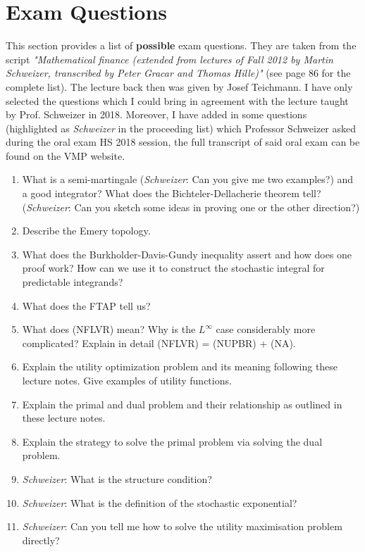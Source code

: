 \documentclass[12pt,a4paper, twoside]{article}
\theoremstyle{definition}
\begin{document}
\section{Exam Questions}
This section provides a list of \textbf{possible} exam questions. They are taken from the script \textit{"Mathematical finance (extended from lectures of Fall 2012 by Martin Schweizer, transcribed by Peter Gracar and Thomas Hille)"} (see page 86 for the complete list). The lecture back then was given by Josef Teichmann. I have only selected the questions which I could bring in agreement with the lecture taught by Prof. Schweizer in 2018. Moreover, I have added in some questions (highlighted as \textit{Schweizer} in the proceeding list) which Professor Schweizer asked during the oral exam HS 2018 session, the full transcript of said oral exam can be found on the VMP website. 
\begin{enumerate}
\item What is a semi-martingale (\textit{Schweizer}: Can you give me two examples?) and a good integrator? What does the Bichteler-Dellacherie theorem tell? (\textit{Schweizer}: Can you sketch some ideas in proving one or the other direction?)
\item Describe the Emery topology.
\item What does the Burkholder-Davis-Gundy inequality assert and how does one proof work? How can we use it to construct the stochastic integral for predictable integrands?
\item What does the FTAP tell us?
\item What does (NFLVR) mean? Why is the $L^\infty$ case considerably more complicated? Explain in detail (NFLVR) = (NUPBR) + (NA).
\item Explain the utility optimization problem and its meaning following these lecture notes. Give examples of utility functions.
\item Explain the primal and dual problem and their relationship as outlined in these lecture notes. 
\item Explain the strategy to solve the primal problem via solving the dual problem. 
\item \textit{Schweizer}: What is the structure condition?
\item \textit{Schweizer}: What is the definition of the stochastic exponential?
\item \textit{Schweizer}: Can you tell me how to solve the utility maximisation problem directly? 
\end{enumerate} 
\end{document}
